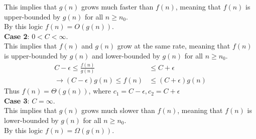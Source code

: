 \documentclass{article}
\begin{document}
\begin{enumerate}
          This implies that \(g(n)\) grows much faster than \(f(n)\), meaning that \(f(n)\) is upper-bounded by \(g(n)\) for all \(n \geq n_0\). \\
          By this logic \(f(n) = O(g(n))\). \\[1em]
          \textbf{Case 2}: \(0 < C < \infty\). \\
          This implies that \(f(n)\) and \(g(n)\) grow at the same rate, meaning that \(f(n)\) is upper-bounded by \(g(n)\) and lower-bounded by \(g(n)\) for all \(n \geq n_0\). \\
          \begin{align*}
              C - \epsilon \leq \frac{f(n)}{g(n)}      & \leq C + \epsilon       \\
              \rightarrow (C - \epsilon)g(n) \leq f(n) & \leq (C + \epsilon)g(n)
          \end{align*}
          Thus \(f(n) = \Theta(g(n))\), where \(c_1 = C - \epsilon, c_2 = C + \epsilon\) \\[1em]
          \textbf{Case 3}: \(C = \infty\). \\
          This implies that \(g(n)\) grows much slower than \(f(n)\), meaning that \(f(n)\) is lower-bounded by \(g(n)\) for all \(n \geq n_0\). \\
          By this logic \(f(n) = \Omega(g(n))\). \\
\end{enumerate}
\end{document}
